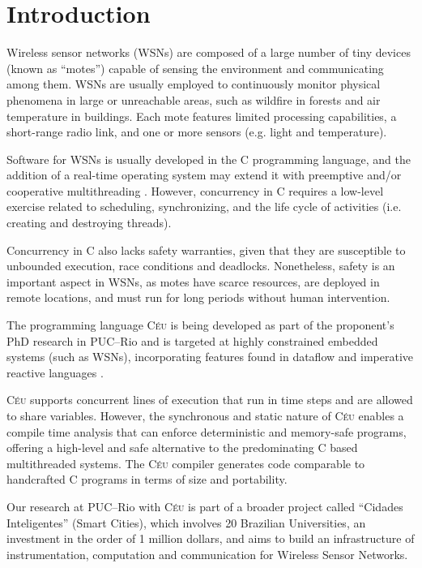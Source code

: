 \documentclass[pdftex,12pt,a4paper]{article}
\newcommand{\CEU}{\textsc{C\'{e}u}}
\begin{document}
\section{Introduction}

Wireless sensor networks (WSNs) are composed of a large number of tiny devices 
(known as ``motes'') capable of sensing the environment and communicating among 
them.
WSNs are usually employed to continuously monitor physical phenomena in large 
or unreachable areas, such as wildfire in forests and air temperature in 
buildings.
Each mote features limited processing capabilities, a short-range radio link, 
and one or more sensors (e.g. light and temperature). \cite{wsn.survey}

Software for WSNs is usually developed in the C programming language, and the 
addition of a real-time operating system may extend it with preemptive and/or 
cooperative multithreading \cite{wsn.contiki,wsn.tos}.
However, concurrency in C requires a low-level exercise related to scheduling, 
synchronizing, and the life cycle of activities (i.e. creating and destroying 
threads).

Concurrency in C also lacks safety warranties, given that they are susceptible 
to unbounded execution, race conditions and deadlocks.
Nonetheless, safety is an important aspect in WSNs, as motes have scarce 
resources, are deployed in remote locations, and must run for long periods 
without human intervention.

The programming language \CEU{} is being developed as part of the proponent's 
PhD research in PUC--Rio and is targeted at highly constrained embedded systems 
(such as WSNs), incorporating features found in dataflow and imperative 
reactive languages \cite{lustre.ieee91, esterel.design}.

\CEU{} supports concurrent lines of execution that run in time steps and are 
allowed to share variables.
However, the synchronous and static nature of \CEU{} enables a compile time 
analysis that can enforce deterministic and memory-safe programs, offering a 
high-level and safe alternative to the predominating C based multithreaded 
systems.
The \CEU{} compiler generates code comparable to handcrafted C programs in 
terms of size and portability.

Our research at PUC--Rio with \CEU{} is part of a broader project called 
``Cidades Inteligentes'' (Smart Cities), which involves 20 Brazilian 
Universities, an investment in the order of 1 million dollars, and aims to 
build an infrastructure of instrumentation, computation and communication for 
Wireless Sensor Networks.
\end{document}
